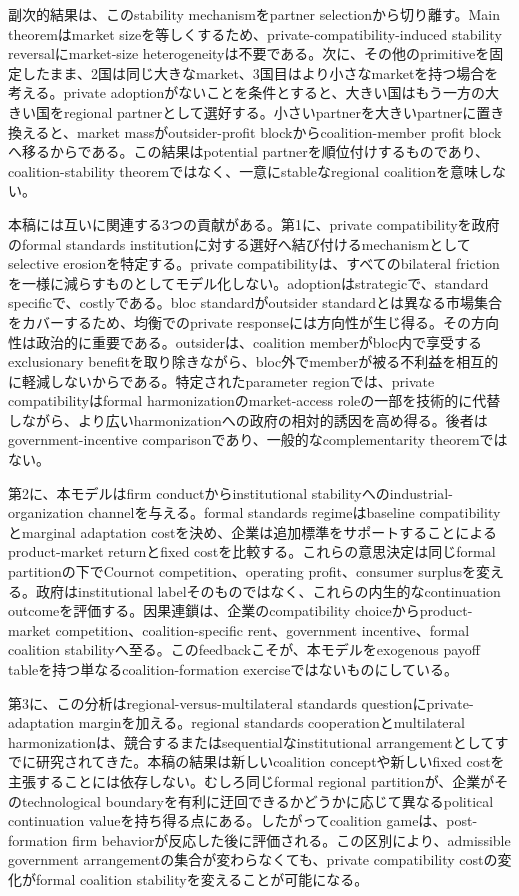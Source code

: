 副次的結果は、このstability mechanismをpartner selectionから切り離す。Main theoremはmarket sizeを等しくするため、private-compatibility-induced stability reversalにmarket-size heterogeneityは不要である。次に、その他のprimitiveを固定したまま、2国は同じ大きなmarket、3国目はより小さなmarketを持つ場合を考える。private adoptionがないことを条件とすると、大きい国はもう一方の大きい国をregional partnerとして選好する。小さいpartnerを大きいpartnerに置き換えると、market massがoutsider-profit blockからcoalition-member profit blockへ移るからである。この結果はpotential partnerを順位付けするものであり、coalition-stability theoremではなく、一意にstableなregional coalitionを意味しない。

本稿には互いに関連する3つの貢献がある。第1に、private compatibilityを政府のformal standards institutionに対する選好へ結び付けるmechanismとしてselective erosionを特定する。private compatibilityは、すべてのbilateral frictionを一様に減らすものとしてモデル化しない。adoptionはstrategicで、standard specificで、costlyである。bloc standardがoutsider standardとは異なる市場集合をカバーするため、均衡でのprivate responseには方向性が生じ得る。その方向性は政治的に重要である。outsiderは、coalition memberがbloc内で享受するexclusionary benefitを取り除きながら、bloc外でmemberが被る不利益を相互的に軽減しないからである。特定されたparameter regionでは、private compatibilityはformal harmonizationのmarket-access roleの一部を技術的に代替しながら、より広いharmonizationへの政府の相対的誘因を高め得る。後者はgovernment-incentive comparisonであり、一般的なcomplementarity theoremではない。

第2に、本モデルはfirm conductからinstitutional stabilityへのindustrial-organization channelを与える。formal standards regimeはbaseline compatibilityとmarginal adaptation costを決め、企業は追加標準をサポートすることによるproduct-market returnとfixed costを比較する。これらの意思決定は同じformal partitionの下でCournot competition、operating profit、consumer surplusを変える。政府はinstitutional labelそのものではなく、これらの内生的なcontinuation outcomeを評価する。因果連鎖は、企業のcompatibility choiceからproduct-market competition、coalition-specific rent、government incentive、formal coalition stabilityへ至る。このfeedbackこそが、本モデルをexogenous payoff tableを持つ単なるcoalition-formation exerciseではないものにしている。

第3に、この分析はregional-versus-multilateral standards questionにprivate-adaptation marginを加える。regional standards cooperationとmultilateral harmonizationは、競合するまたはsequentialなinstitutional arrangementとしてすでに研究されてきた。本稿の結果は新しいcoalition conceptや新しいfixed costを主張することには依存しない。むしろ同じformal regional partitionが、企業がそのtechnological boundaryを有利に迂回できるかどうかに応じて異なるpolitical continuation valueを持ち得る点にある。したがってcoalition gameは、post-formation firm behaviorが反応した後に評価される。この区別により、admissible government arrangementの集合が変わらなくても、private compatibility costの変化がformal coalition stabilityを変えることが可能になる。

